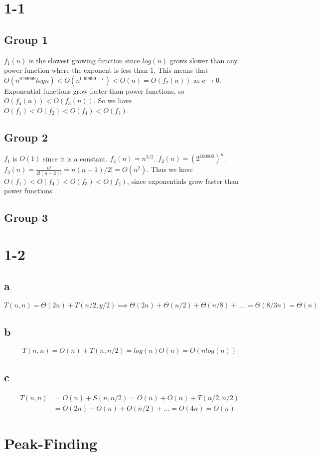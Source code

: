 \documentclass[10pt,a4paper]{article}
\begin{document}
\tableofcontents
\section{1-1}
\subsection*{Group 1}
$f_1(n)$ is the slowest growing function since $log(n)$ grows slower than any power function where the exponent is less than 1. This means that $O(n^{0.99999}logn) < O(n^{0.99999 + c}) < O(n) = O(f_2(n))$ as $c \rightarrow 0$. Exponential functions grow faster than power functions, so $O(f_4(n)) < O(f_3(n))$. So we have $O(f_1)<O(f_2)<O(f_4)<O(f_3)$.
\subsection*{Group 2}
$f_1$ is $O(1)$ since it is a constant. $f_4(n)= n^{3/2}$. $f_2(n)=(2^{100000})^n$. $f_3(n)=\frac{n!}{2!(n-2)!}=n(n-1)/2!=O(n^2)$. Thus we have $O(f_1)<O(f_4)<O(f_3)<O(f_2)$, since exponentials grow faster than power functions.
\subsection*{Group 3}
\section{1-2}
\subsection*{a}
$T(n,n)=\Theta(2n)+T(n/2,y/2) \implies \Theta(2n)+\Theta(n/2)+\Theta(n/8)+....=\Theta(8/3n)=\Theta(n) $ 
\subsection*{b}
\begin{equation}
T(n,n)= O(n)+T(n,n/2) = log(n) O(n)= O(nlog(n))
\end{equation}
\subsection*{c}
\begin{align}
T(n,n) & =O(n)+S(n,n/2)=O(n)+O(n)+T(n/2,n/2) \\
& =O(2n)+O(n)+O(n/2)+...= O(4n)=O(n)
\end{align}
\section{Peak-Finding}
\end{document}

